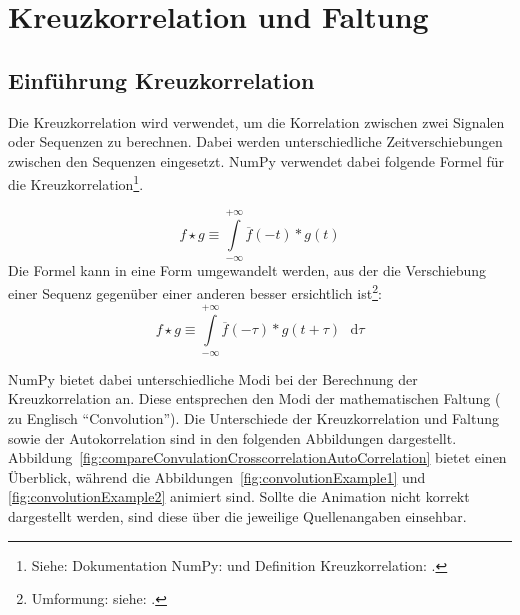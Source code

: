 \chapter{Kreuzkorrelation und Faltung}
\section{Einführung Kreuzkorrelation}
Die Kreuzkorrelation wird verwendet, um die Korrelation zwischen zwei Signalen oder Sequenzen zu berechnen. Dabei werden unterschiedliche Zeitverschiebungen zwischen
den Sequenzen eingesetzt. NumPy verwendet dabei folgende Formel für die 
Kreuzkorrelation\footnote{Siehe: Dokumentation NumPy:\cite{DocumentationNumpyCorrelate} und Definition Kreuzkorrelation: \cite{DefinitionCrossCorrelation}.}.

\[
  f \star g \equiv \int\limits_{-\infty}^{+\infty} \overline{f}(-t)*g(t)
\]
Die Formel kann in eine Form umgewandelt werden, aus der die Verschiebung einer Sequenz gegenüber einer anderen besser ersichtlich 
ist\footnote{Umformung: siehe: \cite{DefinitionCrossCorrelation}.}:
\[
  f \star g \equiv \int\limits_{-\infty}^{+\infty} \overline{f}(-\tau)*g(t + \tau) \text{ } \mathrm{d}\tau
\]

NumPy bietet dabei unterschiedliche Modi bei der Berechnung der Kreuzkorrelation an. Diese entsprechen den Modi der mathematischen Faltung ( zu Englisch \enquote{Convolution}).
Die Unterschiede der Kreuzkorrelation und Faltung sowie der Autokorrelation sind in den folgenden Abbildungen dargestellt.
Abbildung~\ref{fig:compareConvulationCrosscorrelationAutoCorrelation} bietet einen Überblick, während die Abbildungen~\ref{fig:convolutionExample1} und \ref{fig:convolutionExample2} animiert sind.
Sollte die Animation nicht korrekt dargestellt werden, sind diese über die jeweilige Quellenangaben einsehbar.

